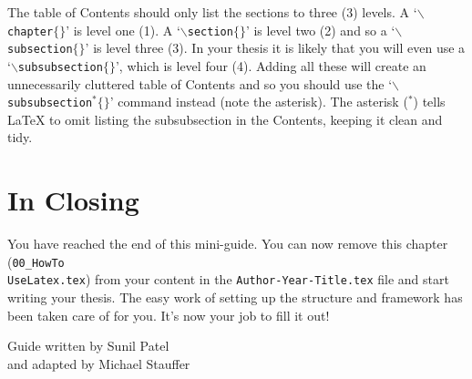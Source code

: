 The table of Contents should only list the sections to three (3) levels. A `$\backslash$\texttt{chapter}$\{\}$' is level one (1). A `$\backslash$\texttt{section}$\{\}$' is level two (2) and so a `$\backslash$\texttt{subsection}$\{\}$' is level three (3). In your thesis it is likely that you will even use a `$\backslash$\texttt{subsubsection}$\{\}$', which is level four (4). Adding all these will create an unnecessarily cluttered table of Contents and so you should use the `$\backslash$\texttt{subsubsection$^{*}\{\}$}' command instead (note the asterisk). The asterisk ($^{*}$) tells \LaTeX{} to omit listing the subsubsection in the Contents, keeping it clean and tidy.


\section{In Closing}

You have reached the end of this mini-guide. You can now remove this chapter (\texttt{00\_HowTo\\UseLatex.tex}) from your content in the \texttt{Author-Year-Title.tex} file and start writing your thesis. The easy work of setting up the structure and framework has been taken care of for you. It's now your job to fill it out!

\begin{flushright}
Guide written by Sunil Patel\\
and adapted by Michael Stauffer\\
\end{flushright}
